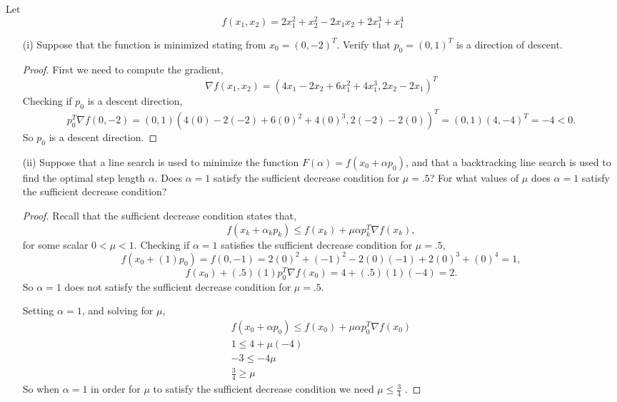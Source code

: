 \documentclass[12pt]{article}
\makeatletter
\theoremstyle{homework}
\newenvironment{exercise}[1]
{\def\@currentlabel{#1}\exercisecore}
{\endexercisecore}
\makeatother
\begin{document}
\begin{exercise}{5.2} Let  
  \begin{equation*}
    f(x_1, x_2) = 2x_1^2 + x_2^2 - 2x_1x_2 + 2x_1^3 + x_1^4
  \end{equation*}
  \begin{enumerate}
    \item[(i)]Suppose that the function is minimized stating from $x_0 = (0, -2)^T$. Verify that 
    $p_0 = (0, 1)^T$ is a direction of descent. 
    \begin{proof} First we need to compute the gradient, 
      \begin{equation*}
        \nabla f(x_1, x_2) = (4x_1 - 2x_2 + 6x_1^2 + 4x_1^3, 2x_2 - 2x_1)^T
      \end{equation*}
      Checking if $p_0$ is a descent direction, 
      \begin{equation*}
        p_0^T\nabla f(0, -2) = (0, 1)(4(0) - 2(-2) + 6(0)^2 + 4(0)^3, 2(-2) - 2(0))^T = (0, 1)(4, -4)^T = -4 < 0.
      \end{equation*}
      So $p_0$ is a descent direction. 
    \end{proof}
\vspace{.25in}


\item[(ii)] Suppose that a line search is used to minimize the function $F(\alpha) = f(x_0 + \alpha p_0)$, 
and that a backtracking line search is used to find the optimal step length $\alpha$. Does $\alpha = 1$ 
satisfy the sufficient decrease condition for $\mu = .5$? For what values of $\mu$ does $\alpha = 1$ satisfy the 
sufficient decrease condition?
\begin{proof} Recall that the sufficient decrease condition states that, 
  \begin{equation*}
    f(x_k + \alpha_k p_k) \leq f(x_k) + \mu \alpha p_k^T\nabla f(x_k), 
  \end{equation*}
  for some scalar $0 < \mu< 1$. 
  Checking if $\alpha = 1$ satisfies the sufficient decrease condition for $\mu = .5$, 
  \begin{equation*}
    f(x_0 + (1)p_0) = f(0, -1) = 2(0)^2 + (-1)^2 - 2(0)(-1) + 2(0)^3 + (0)^4 = 1, 
  \end{equation*}
  \begin{equation*}
    f(x_0) + (.5) (1) p_0^T\nabla f(x_0) = 4 + (.5)(1)(-4) = 2.
  \end{equation*}
  So $\alpha = 1$ does not satisfy the sufficient decrease condition for $\mu = .5$. 

  Setting $\alpha = 1$, and solving for $\mu$, 
  \begin{align*}
    f(x_0 + \alpha p_0) \leq f(x_0) + \mu \alpha p_0^T\nabla f(x_0)\\
    1 \leq 4 + \mu(-4)\\
    -3 \leq -4\mu\\
    \frac{3}{4} \geq \mu
  \end{align*}
  So when $\alpha = 1$ in order for $\mu$ to satisfy the sufficient decrease condition we need $\mu \leq \frac{3}{4}$ . 
\end{proof}
  \end{enumerate}
\end{exercise}
\end{document}
